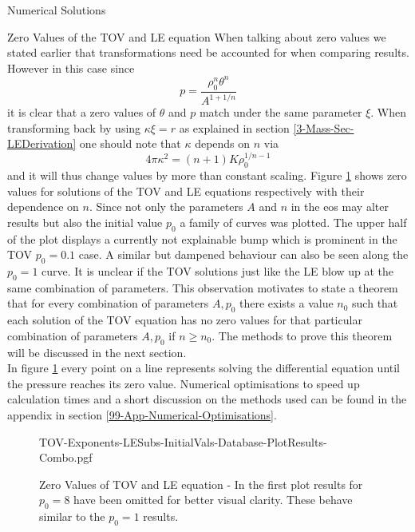 \begin{section}{Numerical Solutions}
\begin{subsection}{Zero Values of the TOV and LE equation}
When talking about zero values we stated earlier that transformations need be accounted for when comparing results.
However in this case since
\begin{equation}
	p=\frac{\rho_0^n\theta^n}{A^{1+1/n}}
\end{equation}
it is clear that a zero values of $\theta$ and $p$ match under the same parameter $\xi$.
When transforming back by using $\kappa\xi=r$ as explained in section \ref{3-Mass-Sec-LEDerivation} one should note that $\kappa$ depends on $n$ via 
\begin{equation}
	4\pi\kappa^2=(n+1)K\rho_0^{1/n-1}
\end{equation}
and it will thus change values by more than constant scaling.
Figure \ref{4-NumSol-Plt-TOV-Exponents-Combo} shows zero values for solutions of the \ac{TOV} and \ac{LE} equations respectively with their dependence on $n$.
Since not only the parameters $A$ and $n$ in the \ac{eos} may alter results but also the initial value $p_0$ a family of curves was plotted.
The upper half of the plot displays a currently not explainable bump which is prominent in the \ac{TOV} $p_0=0.1$ case.
A similar but dampened behaviour can also be seen along the $p_0=1$ curve.
It is unclear if the \ac{TOV} solutions just like the \ac{LE} blow up at the same combination of parameters.
This observation motivates to state a theorem that for every combination of parameters $A,p_0$ there exists a value $n_0$ such that each solution of the TOV equation has no zero values for that particular combination of parameters $A,p_0$ if $n\geq n_0$.
The methods to prove this theorem will be discussed in the next section.\\
In figure \ref{4-NumSol-Plt-TOV-Exponents-Combo} every point on a line represents solving the differential equation until the pressure reaches its zero value.
Numerical optimisations to speed up calculation times and a short discussion on the methods used can be found in the appendix in section \ref{99-App-Numerical-Optimisations}.
\begin{figure}[H]
	\centering
	{TOV-Exponents-LESubs-InitialVals-Database-PlotResults-Combo.pgf}
	\caption[Zero Values of TOV and LE equation]{Zero Values of \ac{TOV} and \ac{LE} equation - 
	In the first plot results for $p_0=8$ have been omitted for better visual clarity. These behave similar to the $p_0=1$ results.}
	\label{4-NumSol-Plt-TOV-Exponents-Combo}
\end{figure}
\end{subsection}
%
%
\end{section}
